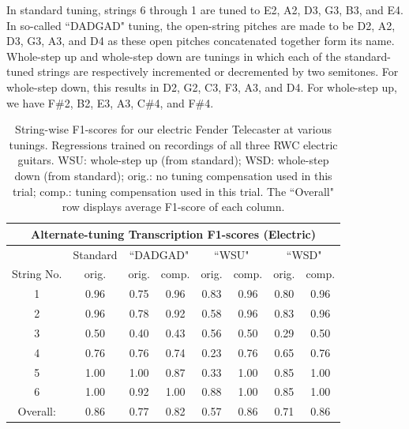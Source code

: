 \documentclass[12pt]{cmuthesis}
\begin{document}
In standard tuning, strings 6 through 1 are tuned to E2, A2, D3, G3, B3, and E4. In so-called ``DADGAD" tuning, the open-string pitches are made to be D2, A2, D3, G3, A3, and D4 as these open pitches concatenated together form its name. Whole-step up and whole-step down are tunings in which each of the standard-tuned strings are respectively incremented or decremented by two semitones. For whole-step down, this results in D2, G2, C3, F3, A3, and D4. For whole-step up, we have F\#2, B2, E3, A3, C\#4, and F\#4.

\begin{table}[!htbp]
\begin{center}
\begin{tabular}{||c||c||c|c||c|c||c|c||}
\hline
\multicolumn{8}{|c|}{\bf{Alternate-tuning Transcription F1-scores (Electric)}} \\
\hline
& Standard & \multicolumn{2}{|c|}{``DADGAD"} & \multicolumn{2}{|c|}{``WSU"} & \multicolumn{2}{|c|}{``WSD"} \\
\hline
String No. & orig. & orig. & comp. & orig. & comp. & orig. & comp. \\
\hline
1 & 0.96 & 0.75 & 0.96 & 0.83 & 0.96 & 0.80 & 0.96 \\
\hline
2 & 0.96 & 0.78 & 0.92 & 0.58 & 0.96 & 0.83 & 0.96\\
\hline
3 & 0.50 & 0.40 & 0.43 & 0.56 & 0.50 & 0.29 & 0.50\\
\hline
4 & 0.76 & 0.76 & 0.74 & 0.23 & 0.76 & 0.65 & 0.76 \\
\hline
5 & 1.00 & 1.00 & 0.87 & 0.33 & 1.00 & 0.85 & 1.00 \\
\hline
6 & 1.00 & 0.92 & 1.00 & 0.88 & 1.00 & 0.85 & 1.00\\ 
\hline
\hline
Overall: & 0.86 & 0.77 & 0.82 & 0.57 & 0.86 & 0.71 & 0.86\\
\hline
\end{tabular}
\caption{String-wise F1-scores for our electric Fender Telecaster at various tunings. Regressions trained on recordings of all three RWC electric guitars. WSU: whole-step up (from standard); WSD: whole-step down (from standard); orig.: no tuning compensation used in this trial; comp.: tuning compensation used in this trial. The ``Overall" row displays average F1-score of each column.} 
\label{tab:resultsTune}
\end{center}
\end{table}
\end{document}
